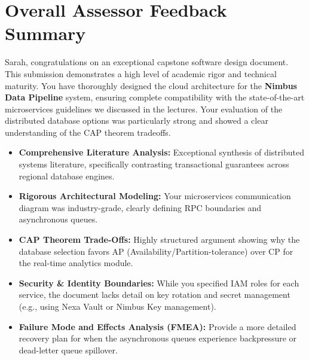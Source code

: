\section*{Overall Assessor Feedback Summary}

Sarah, congratulations on an exceptional capstone software design document. This submission demonstrates a high level of academic rigor and technical maturity. You have thoroughly designed the cloud architecture for the \textbf{Nimbus Data Pipeline} system, ensuring complete compatibility with the state-of-the-art microservices guidelines we discussed in the lectures. Your evaluation of the distributed database options was particularly strong and showed a clear understanding of the CAP theorem tradeoffs.

\vspace{1em}

\begin{tcolorbox}[colframe=success, colback=success!5, arc=3pt, title={\faCheck\ Key Strengths \& Achievements}]
\begin{itemize}[leftmargin=1.5em, labelsep=0.5em]
  \item \textbf{Comprehensive Literature Analysis:} Exceptional synthesis of distributed systems literature, specifically contrasting transactional guarantees across regional database engines.
  \item \textbf{Rigorous Architectural Modeling:} Your microservices communication diagram was industry-grade, clearly defining RPC boundaries and asynchronous queues.
  \item \textbf{CAP Theorem Trade-Offs:} Highly structured argument showing why the database selection favors AP (Availability/Partition-tolerance) over CP for the real-time analytics module.
\end{itemize}
\end{tcolorbox}

\begin{tcolorbox}[colframe=warning, colback=warning!5, arc=3pt, title={\faExclamationTriangle\ Areas for Development \& Improvement}]
\begin{itemize}[leftmargin=1.5em, labelsep=0.5em]
  \item \textbf{Security \& Identity Boundaries:} While you specified IAM roles for each service, the document lacks detail on key rotation and secret management (e.g., using Nexa Vault or Nimbus Key management).
  \item \textbf{Failure Mode and Effects Analysis (FMEA):} Provide a more detailed recovery plan for when the asynchronous queues experience backpressure or dead-letter queue spillover.
\end{itemize}
\end{tcolorbox}


